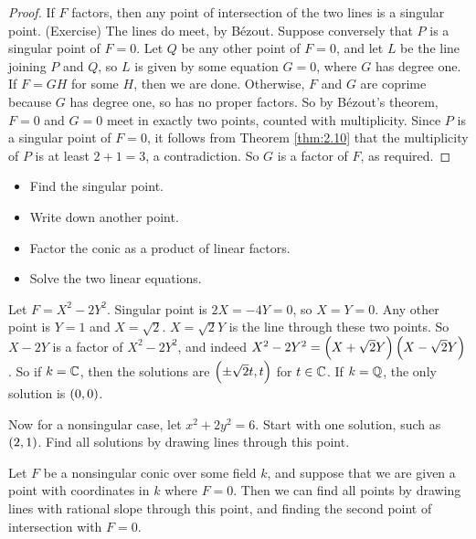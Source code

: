 \begin{proof}
If $ F $ factors, then any point of intersection of the two lines is a singular point. (Exercise) The lines do meet, by Bézout. Suppose conversely that $ P $ is a singular point of $ F = 0 $. Let $ Q $ be any other point of $ F = 0 $, and let $ L $ be the line joining $ P $ and $ Q $, so $ L $ is given by some equation $ G = 0 $, where $ G $ has degree one. If $ F = GH $ for some $ H $, then we are done. Otherwise, $ F $ and $ G $ are coprime because $ G $ has degree one, so has no proper factors. So by Bézout's theorem, $ F = 0 $ and $ G = 0 $ meet in exactly two points, counted with multiplicity. Since $ P $ is a singular point of $ F = 0 $, it follows from Theorem \ref{thm:2.10} that the multiplicity of $ P $ is at least $ 2 + 1 = 3 $, a contradiction. So $ G $ is a factor of $ F $, as required.
\end{proof}

\pagebreak

\begin{algorithm}
\hfill
\begin{itemize}
\item Find the singular point.
\item Write down another point.
\item Factor the conic as a product of linear factors.
\item Solve the two linear equations.
\end{itemize}
\end{algorithm}

\begin{example*}
Let $ F = X^2 - 2Y^2 $. Singular point is $ 2X = -4Y = 0 $, so $ X = Y = 0 $. Any other point is $ Y = 1 $ and $ X = \sqrt{2} $. $ X = \sqrt{2}Y $ is the line through these two points. So $ X - 2Y $ is a factor of $ X^2 - 2Y^2 $, and indeed $ X^2 - 2Y^2 = \br{X + \sqrt{2}Y}\br{X - \sqrt{2}Y} $. So if $ k = \mathbb{C} $, then the solutions are $ \br{\pm\sqrt{2}t, t} $ for $ t \in \mathbb{C} $. If $ k = \mathbb{Q} $, the only solution is $ \br{0, 0} $.
\end{example*}

\begin{example*}
Now for a nonsingular case, let $ x^2 + 2y^2 = 6 $. Start with one solution, such as $ \br{2, 1} $. Find all solutions by drawing lines through this point.
\end{example*}

\begin{algorithm}
Let $ F $ be a nonsingular conic over some field $ k $, and suppose that we are given a point with coordinates in $ k $ where $ F = 0 $. Then we can find all points by drawing lines with rational slope through this point, and finding the second point of intersection with $ F = 0 $.
\end{algorithm}

